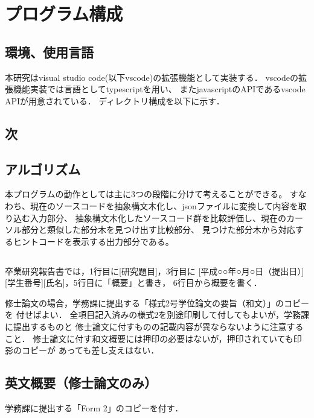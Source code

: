 \documentclass[main]{subfiles}
\begin{document}
\chapter{プログラム構成}

\section{環境、使用言語}
本研究はvisual studio code(以下vscode)の拡張機能として実装する．
vscodeの拡張機能実装では言語としてtypescriptを用い、
またjavascriptのAPIであるvscode APIが用意されている．
ディレクトリ構成を以下に示す．

\section{次}

\section{アルゴリズム}
本プログラムの動作としては主に3つの段階に分けて考えることができる。
すなわち、現在のソースコードを抽象構文木化し、jsonファイルに変換して内容を取り込む入力部分、
抽象構文木化したソースコード群を比較評価し、現在のカーソル部分と類似した部分木を見つけ出す比較部分、
見つけた部分木から対応するヒントコードを表示する出力部分である。

\section{}


卒業研究報告書では，1行目に[研究題目]，3行目に
[平成○○年○月○日（提出日）][学生番号][氏名]，5行目に「概要」と書き，
6行目から概要を書く．

修士論文の場合，学務課に提出する「様式2号学位論文の要旨（和文）」のコピーを
付せばよい．
全項目記入済みの様式2を別途印刷して付してもよいが，学務課に提出するものと
修士論文に付すものの記載内容が異ならないように注意すること．
修士論文に付す和文概要には押印の必要はないが，押印されていても印影のコピーが
あっても差し支えはない．

\section{英文概要（修士論文のみ）}
学務課に提出する「Form 2」のコピーを付す．
\end{document}
